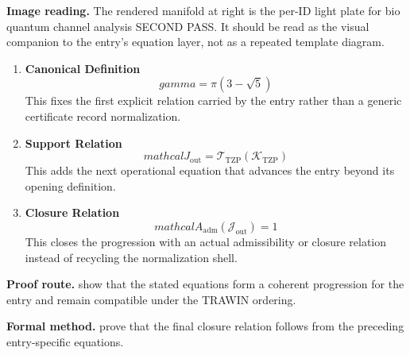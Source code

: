 \begin{samepage}
\noindent\begin{minipage}[t]{0.45\linewidth}
\vspace{0pt}
\raggedright
\scriptsize\textbf{Image reading.} The rendered manifold at right is the per-ID light plate for bio quantum channel analysis SECOND PASS. It should be read as the visual companion to the entry's equation layer, not as a repeated template diagram.\par
\end{minipage}\hfill
\begin{minipage}[t]{0.53\linewidth}
\vspace*{-0.10in}
\raggedright
{}
\end{minipage}
\end{samepage}

\clearpage


\begin{enumerate}[leftmargin=1.6em,itemsep=9pt,topsep=6pt]
\item \textbf{Canonical Definition}
\[
gamma=\pi(3-\sqrt{5})
\]
This fixes the first explicit relation carried by the entry rather than a generic certificate record normalization.

\item \textbf{Support Relation}
\[
mathcal{J}_{\mathrm{out}} = \mathcal{T}_{\mathrm{TZP}}\!\left(\mathcal{K}_{\mathrm{TZP}}\right)
\]
This adds the next operational equation that advances the entry beyond its opening definition.

\item \textbf{Closure Relation}
\[
mathcal{A}_{\mathrm{adm}}\!\left(\mathcal{J}_{\mathrm{out}}\right)=1
\]
This closes the progression with an actual admissibility or closure relation instead of recycling the normalization shell.
\end{enumerate}

\textbf{Proof route.} show that the stated equations form a coherent progression for the entry and remain compatible under the TRAWIN ordering.

\textbf{Formal method.} prove that the final closure relation follows from the preceding entry-specific equations.

\medskip
{}

